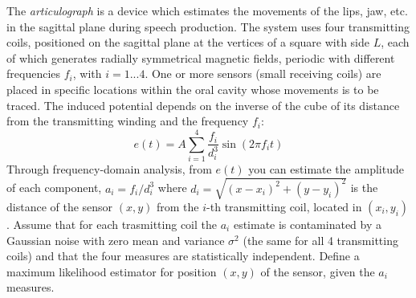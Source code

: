 \Exercise[number={3}]
The \emph{articulograph} is a device which estimates the movements of the
lips, jaw, etc. in the sagittal plane during speech production.
The system uses four transmitting coils, positioned on the sagittal plane
at the vertices of a square with side \(L\), each of which generates radially
symmetrical magnetic fields, periodic with different frequencies \(f_i\),
with \(i=1...4\).
One or more sensors (small receiving coils) are placed in specific locations
within the oral cavity whose movements is to be traced.
The induced potential depends on the inverse of the cube of its distance
from the transmitting winding and the frequency \(f_i\):
\[
    e(t)
    =
    A\sum_{i=1}^{4}\frac{f_i}{d_i^3}\sin{(2\pi f_i t)}
\]
Through frequency-domain analysis, from \(e(t)\) you can estimate the
amplitude of each component, \(a_i=f_i/d_i^3\) where
\(d_i=\sqrt{(x-x_i)^2+(y-y_i)^2}\) is the distance of the sensor \((x,y)\)
from the \(i\)-th transmitting coil, located in \((x_i, y_i)\).
Assume that for each trasmitting coil the \(a_i\) estimate is contaminated
by a Gaussian noise with zero mean and variance \(\sigma^2\) (the same for
all 4 transmitting coils) and that the four measures are statistically
independent. Define a maximum likelihood estimator for position \((x,y)\)
of the sensor, given the \(a_i\) measures.

